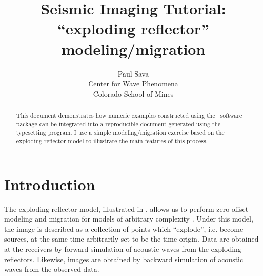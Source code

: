 

\author{Paul Sava \\ Center for Wave Phenomena \\ Colorado School of Mines}
\title{Seismic Imaging Tutorial: \\
  ``exploding reflector'' modeling/migration}
\maketitle

\begin{abstract}
  This document demonstrates how numeric examples constructed using
  the \mg~software package can be integrated into a reproducible
  document generated using the \latex typesetting program. I use a
  simple modeling/migration exercise based on the exploding reflector
  model to illustrate the main features of this process.
\end{abstract}

\section{Introduction}
The exploding reflector model, illustrated in , allows us
to perform zero offset modeling and migration for models of arbitrary
complexity \cite[]{Claerbout.iei.1985}. Under this model, the image is
described as a collection of points which ``explode'', i.e. become
sources, at the same time arbitrarily set to be the time origin. Data
are obtained at the receivers by forward simulation of acoustic waves
from the exploding reflectors. Likewise, images are obtained by
backward simulation of acoustic waves from the observed data.


